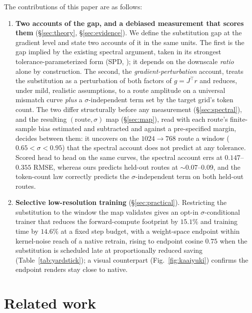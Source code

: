 The contributions of this paper are as follows:

\begin{enumerate}
\item \textbf{Two accounts of the gap, and a debiased measurement
that scores them} (\S\ref{sec:theory}, \S\ref{sec:evidence}). We
define the substitution gap at the gradient level and state two
accounts of it in the same units. The first is the gap
implied by the existing spectral argument, taken in its strongest
tolerance-parameterized form (SPD, \citealp{xiao2026spd}); it
depends on the downscale \emph{ratio} alone by construction. The
second, the \emph{gradient-perturbation} account, treats the
substitution as a perturbation of
both factors of $g = J^{\!\top}r$ and reduces, under mild,
realistic assumptions, to a route amplitude on a universal mismatch
curve \emph{plus} a $\sigma$-independent term set by the target
grid's token count. The two differ structurally before
any measurement (\S\ref{sec:spectral}), and the resulting
$(\text{route}, \sigma)$ map (\S\ref{sec:map}), read with each
route's finite-sample bias estimated and subtracted and against a
pre-specified margin, decides between them: it uncovers on the
$1024{\to}768$ route a window ($0.65 < \sigma < 0.95$) that the
spectral account does not predict at any tolerance. Scored head to
head on the same curves, the spectral account errs at $0.147$--$0.355$
RMSE, whereas ours predicts held-out routes at ${\sim}0.07$--$0.09$,
and the token-count law correctly predicts the $\sigma$-independent
term on both held-out routes.
\item \textbf{Selective low-resolution training} (\S\ref{sec:practical}).
Restricting the substitution to the window the map validates gives
an opt-in $\sigma$-conditional trainer that reduces the forward-compute
footprint by $15.1\%$ and training time by $14.6\%$ at a fixed step
budget, with a weight-space endpoint within kernel-noise reach of a
native retrain, rising to endpoint cosine $0.75$ when the
substitution is scheduled late at proportionally reduced saving
(Table~\ref{tab:yardstick}); a visual
counterpart (Fig.~\ref{fig:kaaiyuki}) confirms the endpoint renders
stay close to native.
\end{enumerate}

\section{Related work}
\label{sec:related}

